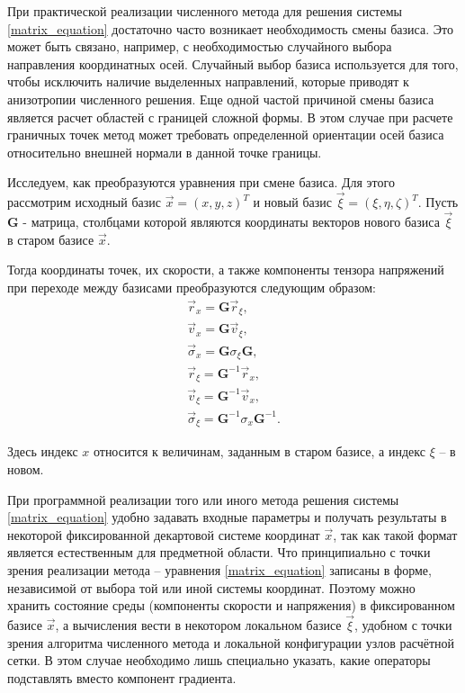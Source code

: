 При практической реализации численного метода для решения системы \ref{matrix_equation} достаточно часто возникает необходимость смены базиса. Это может быть связано, например, с необходимостью случайного выбора направления координатных осей. Случайный выбор базиса используется для того, чтобы исключить наличие выделенных направлений, которые приводят к анизотропии численного решения. Еще одной частой причиной смены базиса является расчет областей с границей сложной формы. В этом случае при расчете граничных точек метод может требовать определенной ориентации осей базиса относительно внешней нормали в данной точке границы.

Исследуем, как преобразуются уравнения при смене базиса. Для этого рассмотрим исходный базис $\vec x = (x, y, z)^T$ и новый базис $\vec \xi = (\xi, \eta, \zeta)^T$. Пусть $\mathbf G$ - матрица, столбцами которой являются координаты векторов нового базиса $\vec \xi$ в старом базисе $\vec x$.

Тогда координаты точек, их скорости, а также компоненты тензора напряжений при переходе между базисами преобразуются следующим образом:
\begin{eqnarray}
\label{basis_change}
\vec r_x = \mathbf G \vec r_{\xi},
\nonumber\\
\vec v_x = \mathbf G \vec v_{\xi},
\nonumber\\
\vec \sigma_x = \mathbf G \sigma_{\xi} \mathbf G,
\nonumber\\
\vec r_{\xi} = {\mathbf G}^{-1} \vec r_x,
\nonumber\\
\vec v_{\xi} = {\mathbf G}^{-1} \vec v_x,
\nonumber\\
\vec \sigma_{\xi} = {\mathbf G}^{-1} \sigma_x {\mathbf G}^{-1}.
\end{eqnarray}

Здесь индекс $x$ относится к величинам, заданным в старом базисе, а индекс $\xi$ -- в новом.

При программной реализации того или иного метода решения системы \ref{matrix_equation} удобно задавать входные параметры и получать результаты в некоторой фиксированной декартовой системе координат $\vec x$, так как такой формат является естественным для предметной области. Что принципиально с точки зрения реализации метода -- уравнения \ref{matrix_equation} записаны в форме, независимой от выбора той или иной системы координат. Поэтому можно хранить состояние среды (компоненты скорости и напряжения) в фиксированном базисе $\vec x$, а вычисления вести в некотором локальном базисе $\vec \xi$, удобном с точки зрения алгоритма численного метода и локальной конфигурации узлов расчётной сетки. В этом случае необходимо лишь специально указать, какие операторы подставлять вместо компонент градиента.

